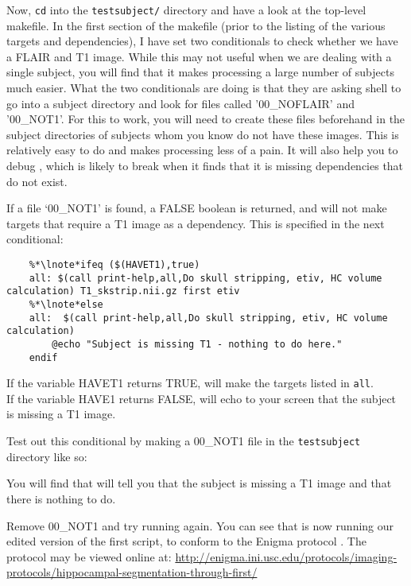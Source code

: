 Now, \texttt{cd} into the \texttt{testsubject/} directory and have a look at the top-level makefile. In the first section of the makefile (prior to the listing of the various targets and dependencies), I have set two conditionals to check whether we have a FLAIR and T1 image. While this may not useful when we are dealing with a single subject, you will find that it makes processing a large number of subjects much easier. What the two conditionals are doing is that they are asking shell to go into a subject directory and look for files called '00_NOFLAIR' and '00_NOT1'. For this to work, you will need to create these files beforehand in the subject directories of subjects whom you know do not have these images. This is relatively easy to do and makes processing less of a pain. It will also help you to debug \maken{}, which is likely to break when it finds that it is missing dependencies that do not exist.  

	
If a file `00_NOT1' is found, a FALSE boolean is returned, and \maken{} will not make targets that require a T1 image as a dependency. This is specified in the next conditional:
\begin{lstlisting}
	%*\lnote*ifeq ($(HAVET1),true)
	all: $(call print-help,all,Do skull stripping, etiv, HC volume calculation) T1_skstrip.nii.gz first etiv
	%*\lnote*else
	all:  $(call print-help,all,Do skull stripping, etiv, HC volume calculation)
		@echo "Subject is missing T1 - nothing to do here."
	endif
\end{lstlisting}

If the variable HAVET1 returns TRUE, \maken{} will make the targets listed in \texttt{all}.\\
\indent{}If the variable HAVE1 returns FALSE, \maken{} will echo to your screen that the subject is missing a T1 image.

Test out this conditional by making a 00_NOT1 file in the \texttt{testsubject} directory like so:

You will find that \maken{} will tell you that the subject is missing a T1 image and that there is nothing to do.

Remove 00_NOT1 and try running \maken{} again. You can see that \maken{} is now running our edited version of the first script, to conform to the Enigma protocol \citep[see][]{Stein2012}. 
The protocol may be viewed online at: \url{http://enigma.ini.usc.edu/protocols/imaging-protocols/hippocampal-segmentation-through-first/}

